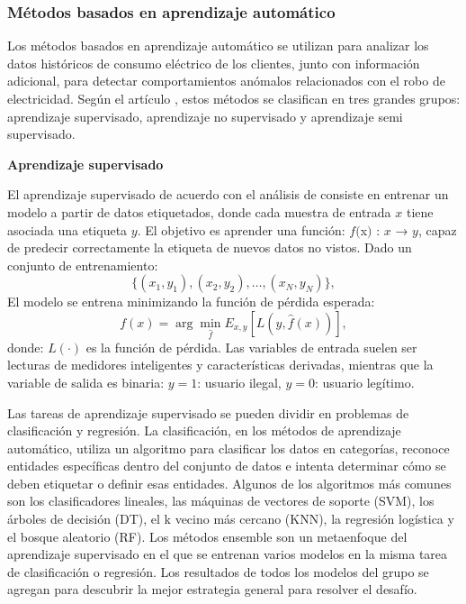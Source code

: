 \documentclass[12pt,a4paper]{report}
\begin{document}
\subsubsection{Métodos basados en aprendizaje automático}

Los métodos basados en aprendizaje automático se utilizan para analizar los datos históricos de consumo eléctrico de los clientes, junto con información adicional, para detectar comportamientos anómalos relacionados con el robo de electricidad. Según el artículo \cite{articulo1}, estos métodos se clasifican en tres grandes grupos: aprendizaje supervisado, aprendizaje no supervisado y aprendizaje semi supervisado.

\medskip

\textbf{Aprendizaje supervisado}

El aprendizaje supervisado de acuerdo con el análisis de \cite{ML Supervisado} consiste en entrenar un modelo a partir de datos etiquetados, donde cada muestra de entrada $x$ tiene asociada una etiqueta $y$. El objetivo es aprender una función: $f($x$)$ : $x$ → $y$, capaz de predecir correctamente la etiqueta de nuevos datos no vistos. Dado un conjunto de entrenamiento:
\[\{(x_1, y_1), (x_2, y_2), \dots, (x_N, y_N)\},\]
El modelo se entrena minimizando la función de pérdida esperada:
\[f(x) = \arg \min_{\hat{f}} {E}_{x,y}[L(y, \hat{f}(x))],\]
donde: $L(\cdot)$ es la función de pérdida. Las variables de entrada suelen ser lecturas de medidores inteligentes y características derivadas, mientras que la variable de salida es binaria: $y = 1$: usuario ilegal, $y = 0$: usuario legítimo.

Las tareas de aprendizaje supervisado se pueden dividir en problemas de clasificación y regresión. La clasificación, en los métodos de aprendizaje automático, utiliza un algoritmo para clasificar los datos en categorías, reconoce entidades específicas dentro del conjunto de datos e intenta determinar cómo se deben etiquetar o definir esas entidades. Algunos de los algoritmos más comunes son los clasificadores lineales, las máquinas de vectores de soporte (SVM), los árboles de decisión (DT), el k vecino más cercano (KNN), la regresión logística y el bosque aleatorio (RF). Los métodos ensemble son un metaenfoque del aprendizaje supervisado en el que se entrenan varios modelos en la misma tarea de clasificación o regresión. Los resultados de todos los modelos del grupo se agregan para descubrir la mejor estrategia general para resolver el desafío.
\end{document}
